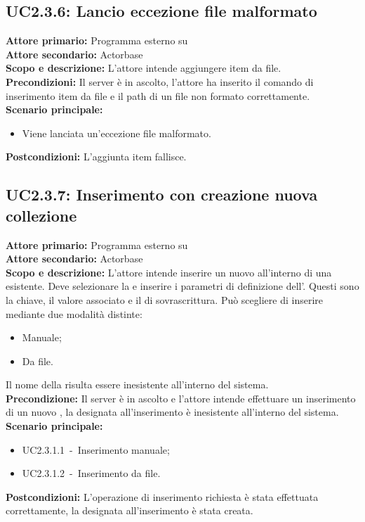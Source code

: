 \documentclass{scalatekids-article}
\begin{document}
\subsection{UC2.3.6: Lancio eccezione file malformato}

\textbf{Attore primario:} Programma esterno su \\
\textbf{Attore secondario:} Actorbase\\
\textbf{Scopo e descrizione:}
L'attore intende aggiungere item da file.\\
\textbf{Precondizioni:} Il server è in ascolto, l'attore ha inserito il comando di inserimento item da file e il path di un file non formato correttamente.\\ %
\textbf{Scenario principale:}
\begin{itemize}
\item Viene lanciata un'eccezione file malformato.
\end{itemize}
\textbf{Postcondizioni:} L'aggiunta item fallisce.

\subsection{UC2.3.7: Inserimento con creazione nuova collezione}

\textbf{Attore primario:} Programma esterno su \\
\textbf{Attore secondario:} Actorbase\\
\textbf{Scopo e descrizione:} L'attore intende inserire un nuovo  all'interno di una  esistente. Deve selezionare la  e inserire i parametri di definizione dell'. Questi sono la chiave, il valore associato e il  di sovrascrittura. Può scegliere di inserire mediante due modalità distinte:
\begin{itemize}
\item Manuale;
\item Da file.
\end{itemize}
Il nome della  risulta essere inesistente all'interno del sistema.\\
\textbf{Precondizione:} Il server è in ascolto e l'attore intende effettuare un inserimento di un nuovo , la  designata all'inserimento è inesistente all'interno del sistema.\\
\textbf{Scenario principale:}
\begin{itemize}
\item UC2.3.1.1\ -\ Inserimento  manuale;
\item UC2.3.1.2\ -\ Inserimento  da file.
\end{itemize}
\textbf{Postcondizioni:} L'operazione di inserimento richiesta è stata effettuata correttamente, la  designata all'inserimento è stata creata.
\end{document}
